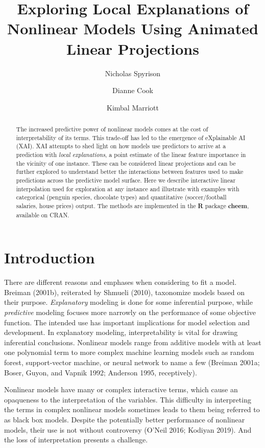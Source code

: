 \documentclass[
]{article}
\title{Exploring Local Explanations of Nonlinear Models Using Animated
Linear Projections}
\author{Nicholas Spyrison \and Dianne Cook \and Kimbal Marriott}
\date{}
\begin{document}
\maketitle
\begin{abstract}
The increased predictive power of nonlinear models comes at the cost of
interpretability of its terms. This trade-off has led to the emergence
of eXplainable AI (XAI). XAI attempts to shed light on how models use
predictors to arrive at a prediction with \emph{local explanations}, a
point estimate of the linear feature importance in the vicinity of one
instance. These can be considered linear projections and can be further
explored to understand better the interactions between features used to
make predictions across the predictive model surface. Here we describe
interactive linear interpolation used for exploration at any instance
and illustrate with examples with categorical (penguin species,
chocolate types) and quantitative (soccer/football salaries, house
prices) output. The methods are implemented in the \textbf{R} package
\textbf{cheem}, available on CRAN.
\end{abstract}

\hypertarget{sec:intro}{%
\section{Introduction}\label{sec:intro}}

There are different reasons and emphases when considering to fit a
model. Breiman (2001b), reiterated by Shmueli (2010), taxonomize models
based on their purpose. \emph{Explanatory} modeling is done for some
inferential purpose, while \emph{predictive} modeling focuses more
narrowly on the performance of some objective function. The intended use
has important implications for model selection and development. In
explanatory modeling, interpretability is vital for drawing inferential
conclusions. Nonlinear models range from additive models with at least
one polynomial term to more complex machine learning models such as
random forest, support-vector machine, or neural network to name a few
(Breiman 2001a; Boser, Guyon, and Vapnik 1992; Anderson 1995,
receptively).

Nonlinear models have many or complex interactive terms, which cause an
opaqueness to the interpretation of the variables. This difficulty in
interpreting the terms in complex nonlinear models sometimes leads to
them being referred to as black box models. Despite the potentially
better performance of nonlinear models, their use is not without
controversy (O'Neil 2016; Kodiyan 2019). And the loss of interpretation
presents a challenge.
\end{document}
